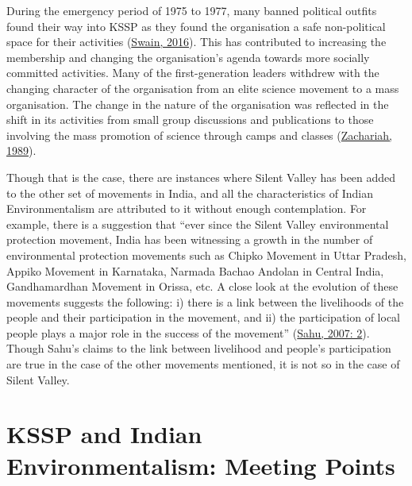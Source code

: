 \documentclass[twoside, 13pt]{article}
\begin{document}
{{During the emergency period of 1975 to 1977, many banned political outfits found their way into KSSP as they found the organisation a safe non-political space for their activities (\underline{Swain, 2016}). This has contributed to increasing the membership and changing the organisation's agenda towards more socially committed activities. Many of the first-generation leaders withdrew with the changing character of the organisation from an elite science movement to a mass organisation. The change in the nature of the organisation was reflected in the shift in its activities from small group discussions and publications to those involving the mass promotion of science through camps and classes (\underline{Zachariah, 1989}).

Though that is the case, there are instances where Silent Valley has been added to the other set of movements in India, and all the characteristics of Indian Environmentalism are attributed to it without enough contemplation. For example, there is a suggestion that “ever since the Silent Valley environmental protection movement, India has been witnessing a growth in the number of environmental protection movements such as Chipko Movement in Uttar Pradesh, Appiko Movement in Karnataka, Narmada Bachao Andolan in Central India, Gandhamardhan Movement in Orissa, etc. A close look at the evolution of these movements suggests the following: i) there is a link between the livelihoods of the people and their participation in the movement, and ii) the participation of local people plays a major role in the success of the movement” (\underline{Sahu, 2007: 2}). Though Sahu’s claims to the link between livelihood and people’s participation are true in the case of the other movements mentioned, it is not so in the case of Silent Valley.}

\vspace{-.3cm}

{\fontsize{18}{20}\selectfont\section*{KSSP and Indian Environmentalism: Meeting Points}}

\vspace{-.2cm}

}
\end{document}
